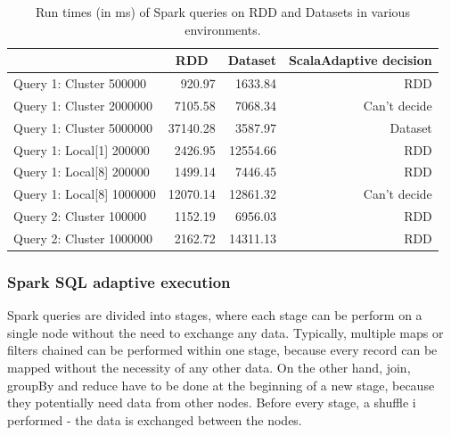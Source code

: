 \begin{table}[h!]
	\centering
	\captionsetup{justification=centering,margin=0.5cm}
	\bgroup
	\def\arraystretch{1.5}%
	\begin{tabular}{|l|r|r|r|}
		\hline
		& \multicolumn{1}{c|}{\textbf{RDD}} & \multicolumn{1}{c|}{\textbf{Dataset}} & \multicolumn{1}{c|}{\textbf{ScalaAdaptive decision}} \\ \hline
		Query 1: Cluster 500000       & 920.97                            & 1633.84                           & RDD                                                  \\ \hline
		Query 1: Cluster 2000000      & 7105.58                           & 7068.34                           & Can't decide                                         \\ \hline
		Query 1: Cluster 5000000      & 37140.28                          & 3587.97                           & Dataset                                                  \\ \hline
		Query 1: Local{[}1{]} 200000  & 2426.95                           & 12554.66                          & RDD                                                  \\ \hline
		Query 1: Local{[}8{]} 200000  & 1499.14                           & 7446.45                           & RDD                                                  \\ \hline
		Query 1: Local{[}8{]} 1000000 & 12070.14                          & 12861.32                          & Can't decide                                         \\ \hline
		Query 2: Cluster 100000 & 1152.19 &	6956.03 & RDD \\ \hline
		Query 2: Cluster 1000000      & 2162.72                           & 14311.13                          & RDD                                                  \\ \hline
	\end{tabular}
\egroup
\caption{Run times (in ms) of Spark queries on RDD and Datasets in various environments.}
\label{tab:spark_adaptive_rdd_vs_ds_test}
\end{table}

\subsubsection{Spark SQL adaptive execution}

Spark queries are divided into stages, where each stage can be perform on a single node without the need to exchange any data. Typically, multiple maps or filters chained can be performed within one stage, because every record can be mapped without the necessity of any other data. On the other hand, join, groupBy and reduce have to be done at the beginning of a new stage, because they potentially need data from other nodes. Before every stage, a shuffle i performed - the data is exchanged between the nodes. 

